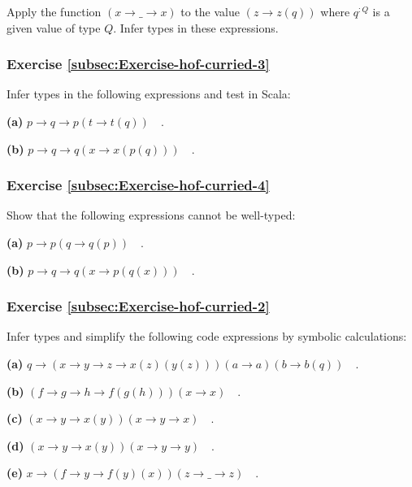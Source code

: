 Apply the function $\left(x\rightarrow\_\rightarrow x\right)$ to
the value $\left(z\rightarrow z(q)\right)$ where $q^{:Q}$ is a given
value of type $Q$. Infer types in these expressions.

\subsubsection{Exercise \label{subsec:Exercise-hof-curried-3}\ref{subsec:Exercise-hof-curried-3}}

Infer types in the following expressions and test in Scala:

\textbf{(a)} $p\rightarrow q\rightarrow p(t\rightarrow t(q))\quad.$

\textbf{(b)} $p\rightarrow q\rightarrow q(x\rightarrow x(p(q)))\quad.$

\subsubsection{Exercise \label{subsec:Exercise-hof-curried-4}\ref{subsec:Exercise-hof-curried-4}}

Show that the following expressions cannot be well-typed:

\textbf{(a)} $p\rightarrow p(q\rightarrow q(p))\quad.$

\textbf{(b)} $p\rightarrow q\rightarrow q(x\rightarrow p(q(x)))\quad.$

\subsubsection{Exercise \label{subsec:Exercise-hof-curried-2}\ref{subsec:Exercise-hof-curried-2}}

Infer types and simplify the following code expressions by symbolic
calculations:

\textbf{(a)} $q\rightarrow\left(x\rightarrow y\rightarrow z\rightarrow x(z)(y(z))\right)\left(a\rightarrow a\right)\left(b\rightarrow b(q)\right)\quad.$

\textbf{(b)} $\left(f\rightarrow g\rightarrow h\rightarrow f(g(h))\right)(x\rightarrow x)\quad.$

\textbf{(c)} $\left(x\rightarrow y\rightarrow x(y)\right)\left(x\rightarrow y\rightarrow x\right)\quad.$

\textbf{(d)} $\left(x\rightarrow y\rightarrow x(y)\right)\left(x\rightarrow y\rightarrow y\right)\quad.$

\textbf{(e)} $x\rightarrow\left(f\rightarrow y\rightarrow f(y)(x)\right)\left(z\rightarrow\_\rightarrow z\right)\quad.$


